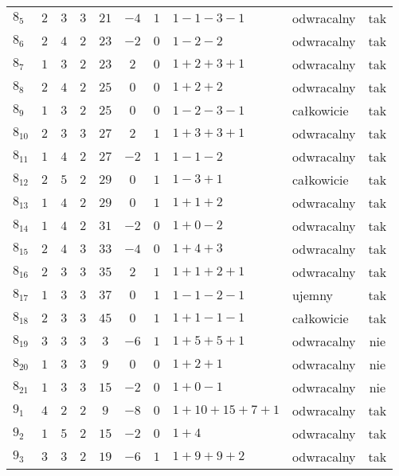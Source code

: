 \begin{longtable}{lccccccllc}
$8_{5}$    & $2$   & $3$ & $3$ & $21$  & $-4$ & $1$ & $1-1-3-1$     & odwracalny & tak \\
$8_{6}$    & $2$   & $4$ & $2$ & $23$  & $-2$ & $0$ & $1-2-2$       & odwracalny & tak \\
$8_{7}$    & $1$   & $3$ & $2$ & $23$  & $2$  & $0$ & $1+2+3+1$     & odwracalny & tak \\
$8_{8}$    & $2$   & $4$ & $2$ & $25$  & $0$  & $0$ & $1+2+2$       & odwracalny & tak \\
$8_{9}$    & $1$   & $3$ & $2$ & $25$  & $0$  & $0$ & $1-2-3-1$     & całkowicie & tak \\
$8_{10}$   & $2$   & $3$ & $3$ & $27$  & $2$  & $1$ & $1+3+3+1$     & odwracalny & tak \\
$8_{11}$   & $1$   & $4$ & $2$ & $27$  & $-2$ & $1$ & $1-1-2$       & odwracalny & tak \\
$8_{12}$   & $2$   & $5$ & $2$ & $29$  & $0$  & $1$ & $1-3+1$       & całkowicie & tak \\
$8_{13}$   & $1$   & $4$ & $2$ & $29$  & $0$  & $1$ & $1+1+2$       & odwracalny & tak \\
$8_{14}$   & $1$   & $4$ & $2$ & $31$  & $-2$ & $0$ & $1+0-2$       & odwracalny & tak \\
$8_{15}$   & $2$   & $4$ & $3$ & $33$  & $-4$ & $0$ & $1+4+3$       & odwracalny & tak \\
$8_{16}$   & $2$   & $3$ & $3$ & $35$  & $2$  & $1$ & $1+1+2+1$     & odwracalny & tak \\
$8_{17}$   & $1$   & $3$ & $3$ & $37$  & $0$  & $1$ & $1-1-2-1$     & ujemny     & tak \\
$8_{18}$   & $2$   & $3$ & $3$ & $45$  & $0$  & $1$ & $1+1-1-1$     & całkowicie & tak \\
$8_{19}$   & $3$   & $3$ & $3$ & $3$   & $-6$ & $1$ & $1+5+5+1$     & odwracalny & nie \\
$8_{20}$   & $1$   & $3$ & $3$ & $9$   & $0$  & $0$ & $1+2+1$       & odwracalny & nie \\
$8_{21}$   & $1$   & $3$ & $3$ & $15$  & $-2$ & $0$ & $1+0-1$       & odwracalny & nie \\
$9_{1}$    & $4$   & $2$ & $2$ & $9$   & $-8$ & $0$ & $1+10+15+7+1$ & odwracalny & tak \\
$9_{2}$    & $1$   & $5$ & $2$ & $15$  & $-2$ & $0$ & $1+4$         & odwracalny & tak \\
$9_{3}$    & $3$   & $3$ & $2$ & $19$  & $-6$ & $1$ & $1+9+9+2$     & odwracalny & tak \\

\end{longtable}
